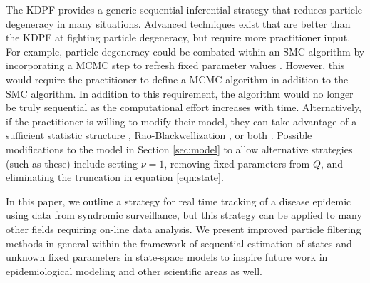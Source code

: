 
The KDPF provides a generic sequential inferential strategy that reduces particle degeneracy in many situations. Advanced techniques exist that are better than the KDPF at fighting particle degeneracy, but require more practitioner input. For example, particle degeneracy could be combated within an SMC algorithm by incorporating a MCMC step to refresh fixed parameter values \citep{Gilk:Berz:foll:2001,Stor:part:2002}. However, this would require the practitioner to define a MCMC algorithm in addition to the SMC algorithm. In addition to this requirement, the algorithm would no longer be truly sequential as the computational effort increases with time. Alternatively, if the practitioner is willing to modify their model, they can take advantage of a sufficient statistic structure \citep{Fear:mark:2002}, Rao-Blackwellization \citep{Douc:Gods:Andr:on:2000}, or both \citep{carvalho2010particle}. Possible modifications to the model in Section \ref{sec:model} to allow alternative strategies (such as these) include setting $\nu=1$, removing fixed parameters from $Q$, and eliminating the truncation in equation \eqref{eqn:state}.

In this paper, we outline a strategy for real time tracking of a disease epidemic using data from syndromic surveillance, but this strategy can be applied to many other fields requiring on-line data analysis. We present improved particle filtering methods in general within the framework of sequential estimation of states and unknown fixed parameters in state-space models to inspire future work in epidemiological modeling and other scientific areas as well. 